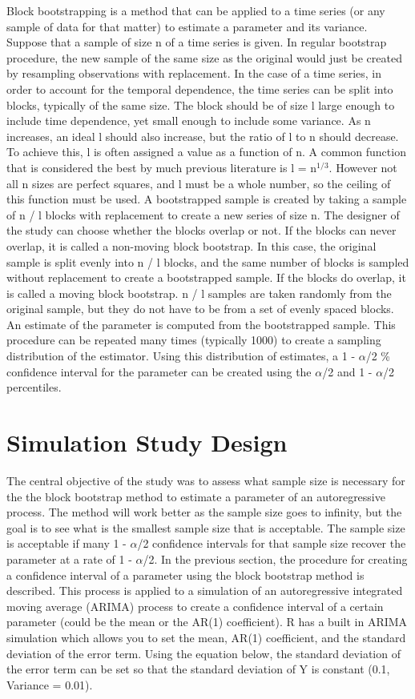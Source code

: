\documentclass[12pt, letterpaper, titlepage]{article}
\begin{document}
Block bootstrapping is a method that can be applied to a time series (or any sample of data for that matter) to estimate a parameter and its variance. Suppose that a sample of size n of a time series is given. In regular bootstrap procedure, the new sample of the same size as the original would just be created by resampling observations with replacement. In the case of a time series, in order to account for the temporal dependence, the time series can be split into blocks, typically of the same size. The block should be of size l large enough to include time dependence, yet small enough to include some variance. As n increases, an ideal l should also increase, but the ratio of l to n should decrease. To achieve this, l is often assigned a value as a function of n. A common function that is considered the best by much previous literature is l = n$^{1/3}$. However not all n sizes are perfect squares, and l must be a whole number, so the ceiling of this function must be used. A bootstrapped sample is created by taking a sample of n / l blocks with replacement to create a new series of size n. The designer of the study can choose whether the blocks overlap or not. If the blocks can never overlap, it is called a non-moving block bootstrap. In this case, the original sample is split evenly into n / l blocks, and the same number of blocks is sampled without replacement to create a bootstrapped sample. If the blocks do overlap, it is called a moving block bootstrap. n / l samples are taken randomly from the original sample, but they do not have to be from a set of evenly spaced blocks. An estimate of the parameter is computed from the bootstrapped sample. This procedure can be repeated many times (typically 1000) to create a sampling distribution of the estimator. Using this distribution of estimates, a 1 - $\alpha$/2 \% confidence interval for the parameter can be created using the $\alpha$/2 and 1 - $\alpha$/2 percentiles.

\section{Simulation Study Design}
\label{sec:simdesign}

The central objective of the study was to assess what sample size is necessary for the the block bootstrap method to estimate a parameter of an autoregressive process. The method will work better as the sample size goes to infinity, but the goal is to see what is the smallest sample size that is acceptable. The sample size is acceptable if many 1 - $\alpha$/2 confidence intervals for that sample size recover the parameter at a rate of 1 - $\alpha$/2. In the previous section, the procedure for creating a confidence interval of a parameter using the block bootstrap method is described. This process is applied to a simulation of an autoregressive integrated moving average (ARIMA) process to create a confidence interval of a certain parameter (could be the mean or the AR(1) coefficient). R has a built in ARIMA simulation which allows you to set the mean, AR(1) coefficient, and the standard deviation of the error term. Using the equation below, the standard deviation of the error term can be set so that the standard deviation of Y is constant (0.1, Variance = 0.01). 
\end{document}
